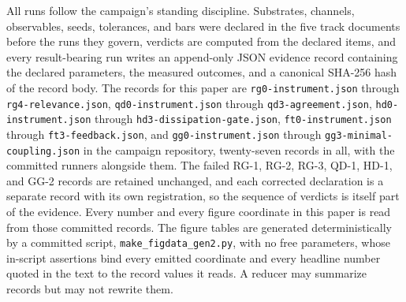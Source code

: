 \documentclass[aps,pre,reprint,nofootinbib,floatfix]{revtex4-2}
\begin{document}
All runs follow the campaign's standing discipline.  Substrates,
channels, observables, seeds, tolerances, and bars were declared in
the five track documents before the runs they govern, verdicts are
computed from the declared items, and every result-bearing run
writes an append-only JSON evidence record containing the declared
parameters, the measured outcomes, and a canonical SHA-256 hash of
the record body.  The records for this paper are
\texttt{rg0-instrument.json} through \texttt{rg4-relevance.json},
\texttt{qd0-instrument.json} through \texttt{qd3-agreement.json},
\texttt{hd0-instrument.json} through
\texttt{hd3-dissipation-gate.json},
\texttt{ft0-instrument.json} through \texttt{ft3-feedback.json},
and \texttt{gg0-instrument.json} through
\texttt{gg3-minimal-coupling.json} in the campaign repository,
twenty-seven records in all, with the committed runners alongside
them.  The failed RG-1, RG-2, RG-3, QD-1, HD-1, and GG-2 records
are retained unchanged, and each corrected declaration is a
separate record with its own registration, so the sequence of
verdicts is itself part of the evidence.  Every number and every
figure coordinate in this paper is read from those committed
records.  The figure tables are generated deterministically by a
committed script, \texttt{make\_figdata\_gen2.py}, with no free
parameters, whose in-script assertions bind every emitted
coordinate and every headline number quoted in the text to the
record values it reads.  A reducer may summarize records but may
not rewrite them.
\end{document}
